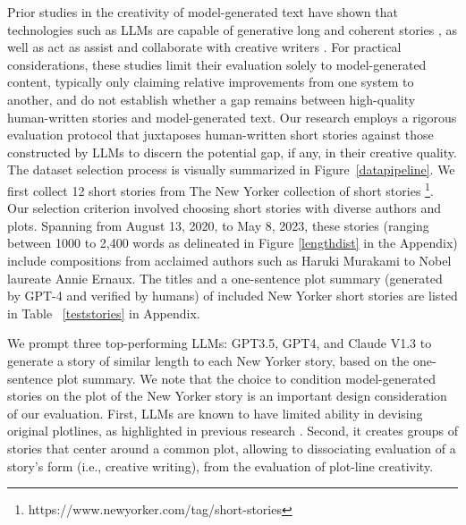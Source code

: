 Prior studies in the creativity of model-generated text have shown that technologies such as LLMs are capable of generative long and coherent stories \cite{yang2022doc,yang2022re3}, as well as act as assist and collaborate with creative writers \cite{yuan2022wordcraft,ippolito2022creative,mirowski2023cowriting}. For practical considerations, these studies limit their evaluation solely to model-generated content, typically only claiming relative improvements from one system to another, and do not establish whether a gap remains between high-quality human-written stories and model-generated text. Our research employs a rigorous evaluation protocol that juxtaposes human-written short stories against those constructed by LLMs to discern the potential gap, if any, in their creative quality. The dataset selection process is visually summarized in Figure~\ref{datapipeline}. We first collect 12 short stories from The New Yorker collection of short stories \footnote{https://www.newyorker.com/tag/short-stories}. Our selection criterion involved choosing short stories with diverse authors and plots. Spanning from August 13, 2020, to May 8, 2023, these stories (ranging between 1000 to 2,400 words as delineated in Figure \ref{lengthdist} in the Appendix) include compositions from acclaimed authors such as Haruki Murakami to Nobel laureate Annie Ernaux. The titles and a one-sentence plot summary (generated by GPT-4 and verified by humans) of included New Yorker short stories are listed in Table ~\ref{teststories} in Appendix.

We prompt three top-performing LLMs: GPT3.5, GPT4, and Claude V1.3 to generate a story of similar length to each New Yorker story, based on the one-sentence plot summary. We note that the choice to condition model-generated stories on the plot of the New Yorker story is an important design consideration of our evaluation. First, LLMs are known to have limited ability in devising original plotlines, as highlighted in previous research \cite{ippolito2022creative}. Second, it creates groups of stories that center around a common plot, allowing to dissociating evaluation of a story's form (i.e., creative writing), from the evaluation of plot-line creativity. 

